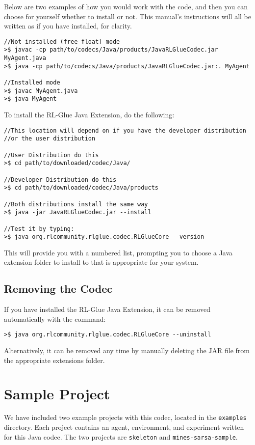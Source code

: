 \documentclass[11pt]{article}
\begin{document}
Below are two examples of how you would work with the code, and then you can choose for yourself whether to install or not.  This manual's instructions will all be written as if you have installed, for clarity.

\begin{verbatim}
//Not installed (free-float) mode
>$ javac -cp path/to/codecs/Java/products/JavaRLGlueCodec.jar MyAgent.java
>$ java -cp path/to/codecs/Java/products/JavaRLGlueCodec.jar:. MyAgent

//Installed mode
>$ javac MyAgent.java
>$ java MyAgent
\end{verbatim}

To install the RL-Glue Java Extension, do the following:
\begin{verbatim}
//This location will depend on if you have the developer distribution
//or the user distribution

//User Distribution do this
>$ cd path/to/downloaded/codec/Java/

//Developer Distribution do this
>$ cd path/to/downloaded/codec/Java/products

//Both distributions install the same way
>$ java -jar JavaRLGlueCodec.jar --install

//Test it by typing:
>$ java org.rlcommunity.rlglue.codec.RLGlueCore --version
\end{verbatim}

This will provide you with a numbered list, prompting you to choose a Java extension folder to install to that is appropriate for your system.

\subsection{Removing the Codec}
If you have installed the RL-Glue Java Extension, it can be removed automatically with the command:
\begin{verbatim}
>$ java org.rlcommunity.rlglue.codec.RLGlueCore --uninstall
\end{verbatim}

Alternatively, it can be removed any time by manually deleting the JAR file from the appropriate extensions folder.

\section{Sample Project}
We have included two example projects with this codec, located in the \texttt{examples} directory.  Each project contains an agent, environment, and experiment written for this Java codec.  The two projects are \texttt{skeleton} and \texttt{mines-sarsa-sample}.
\end{document}
